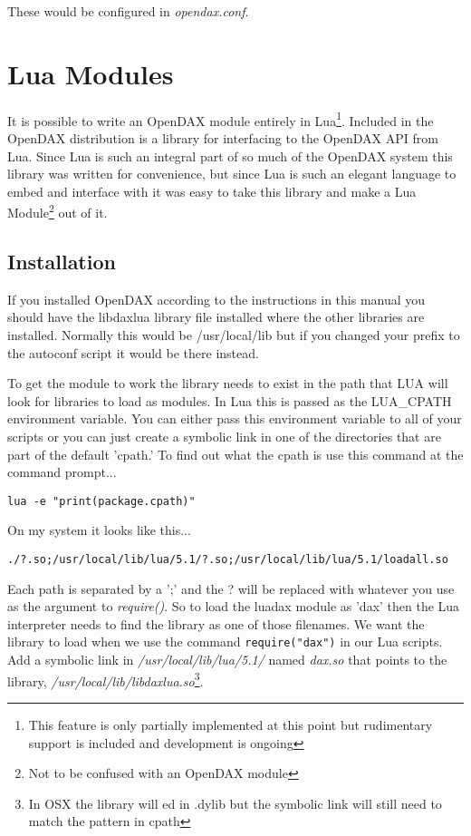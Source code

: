 These would be configured in \textit{opendax.conf}.

\chapter{Lua Modules}

It is possible to write an OpenDAX module entirely in Lua\footnote{This feature is only partially implemented at this point but rudimentary support is included and development is ongoing}.  Included in the OpenDAX distribution is a library for interfacing to the OpenDAX API from Lua.  Since Lua is such an integral part of so much of the OpenDAX system this library was written for convenience, but since Lua is such an elegant language to embed and interface with it was easy to take this library and make a Lua Module\footnote{Not to be confused with an OpenDAX module} out of it. 

\section{Installation}

If you installed OpenDAX according to the instructions in this manual you should have the libdaxlua library file installed where the other libraries are installed.  Normally this would be /usr/local/lib but if you changed your prefix to the autoconf script it would be there instead.

To get the module to work the library needs to exist in the path that LUA will look for libraries to load as modules.  In Lua this is passed as the LUA\_CPATH environment variable.  You can either pass this environment variable to all of your scripts or you can just create a symbolic link in one of the directories that are part of the default 'cpath.'  To find out what the cpath is use this command at the command prompt...

\verb|lua -e "print(package.cpath)"|

On my system it looks like this...

\verb|./?.so;/usr/local/lib/lua/5.1/?.so;/usr/local/lib/lua/5.1/loadall.so|

Each path is separated by a ';' and the ? will be replaced with whatever you use as the argument to \textit{require()}.  So to load the luadax module as 'dax' then the Lua interpreter needs to find the library as one of those filenames.  We want the library to load when we use the command \verb|require("dax")| in our Lua scripts.  Add a symbolic link in \textit{/usr/local/lib/lua/5.1/} named \textit{dax.so} that points to the library, \textit{/usr/local/lib/libdaxlua.so}\footnote{In OSX the library will ed in .dylib but the symbolic link will still need to match the pattern in cpath}.

